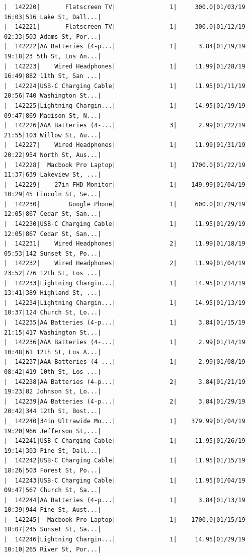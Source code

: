 \documentclass[
  letterpaper,
  DIV=11,
  numbers=noendperiod]{scrartcl}
\begin{document}
\begin{verbatim}
|  142220|       Flatscreen TV|               1|     300.0|01/03/19 16:03|516 Lake St, Dall...|
|  142221|       Flatscreen TV|               1|     300.0|01/12/19 02:33|503 Adams St, Por...|
|  142222|AA Batteries (4-p...|               1|      3.84|01/19/19 19:18|23 5th St, Los An...|
|  142223|    Wired Headphones|               1|     11.99|01/28/19 16:49|882 11th St, San ...|
|  142224|USB-C Charging Cable|               1|     11.95|01/11/19 20:56|740 Washington St...|
|  142225|Lightning Chargin...|               1|     14.95|01/19/19 09:47|869 Madison St, N...|
|  142226|AAA Batteries (4-...|               3|      2.99|01/22/19 21:55|103 Willow St, Au...|
|  142227|    Wired Headphones|               1|     11.99|01/31/19 20:22|954 North St, Aus...|
|  142228|  Macbook Pro Laptop|               1|    1700.0|01/22/19 11:37|639 Lakeview St, ...|
|  142229|    27in FHD Monitor|               1|    149.99|01/04/19 10:29|45 Lincoln St, Se...|
|  142230|        Google Phone|               1|     600.0|01/29/19 12:05|867 Cedar St, San...|
|  142230|USB-C Charging Cable|               1|     11.95|01/29/19 12:05|867 Cedar St, San...|
|  142231|    Wired Headphones|               2|     11.99|01/18/19 05:53|142 Sunset St, Po...|
|  142232|    Wired Headphones|               2|     11.99|01/04/19 23:52|776 12th St, Los ...|
|  142233|Lightning Chargin...|               1|     14.95|01/14/19 13:41|389 Highland St, ...|
|  142234|Lightning Chargin...|               1|     14.95|01/13/19 10:37|124 Church St, Lo...|
|  142235|AA Batteries (4-p...|               1|      3.84|01/15/19 21:15|417 Washington St...|
|  142236|AAA Batteries (4-...|               1|      2.99|01/14/19 10:48|61 12th St, Los A...|
|  142237|AAA Batteries (4-...|               1|      2.99|01/08/19 08:42|419 10th St, Los ...|
|  142238|AA Batteries (4-p...|               2|      3.84|01/21/19 19:23|82 Johnson St, Lo...|
|  142239|AA Batteries (4-p...|               2|      3.84|01/29/19 20:42|344 12th St, Bost...|
|  142240|34in Ultrawide Mo...|               1|    379.99|01/04/19 19:20|966 Jefferson St,...|
|  142241|USB-C Charging Cable|               1|     11.95|01/26/19 19:14|303 Pine St, Dall...|
|  142242|USB-C Charging Cable|               1|     11.95|01/15/19 18:26|503 Forest St, Po...|
|  142243|USB-C Charging Cable|               1|     11.95|01/04/19 09:47|567 Church St, Sa...|
|  142244|AA Batteries (4-p...|               1|      3.84|01/13/19 10:39|944 Pine St, Aust...|
|  142245|  Macbook Pro Laptop|               1|    1700.0|01/15/19 18:07|245 Sunset St, Sa...|
|  142246|Lightning Chargin...|               1|     14.95|01/29/19 10:10|265 River St, Por...|

\end{verbatim}
\end{document}
